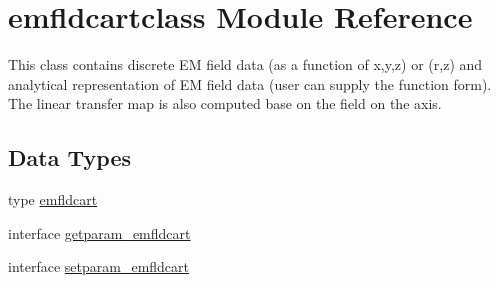 \hypertarget{namespaceemfldcartclass}{}\section{emfldcartclass Module Reference}
\label{namespaceemfldcartclass}


This class contains discrete EM field data (as a function of x,y,z) or (r,z) and analytical representation of EM field data (user can supply the function form). The linear transfer map is also computed base on the field on the axis.  


\subsection*{Data Types}
\begin{DoxyCompactItemize}
\item 
type \mbox{\hyperlink{namespaceemfldcartclass_structemfldcartclass_1_1emfldcart}{emfldcart}}
\item 
interface \mbox{\hyperlink{interfaceemfldcartclass_1_1getparam__emfldcart}{getparam\+\_\+emfldcart}}
\item 
interface \mbox{\hyperlink{interfaceemfldcartclass_1_1setparam__emfldcart}{setparam\+\_\+emfldcart}}
\end{DoxyCompactItemize}
